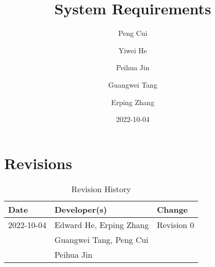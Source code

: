 \documentclass{article}
\title{System Requirements}
\author{Peng Cui\and Yiwei He\and Peihua Jin\and Guangwei Tang\and Erping Zhang}
\date{2022-10-04}
\begin{document}
\maketitle
\section{Revisions}
\begin{table}[hp]
\caption{Revision History} \label{TblRevisionHistory}
\begin{tabularx}{\textwidth}{llX}
\toprule
\textbf{Date} & \textbf{Developer(s)} & \textbf{Change}\\
\midrule
2022-10-04 & Edward He, Erping Zhang & Revision 0\\
& Guangwei Tang, Peng Cui & \\
& Peihua Jin & \\

\bottomrule
\end{tabularx}
\end{table}

\newpage

\tableofcontents
\listoftables
\listoffigures
\cleardoublepage

\newpage
\end{document}
